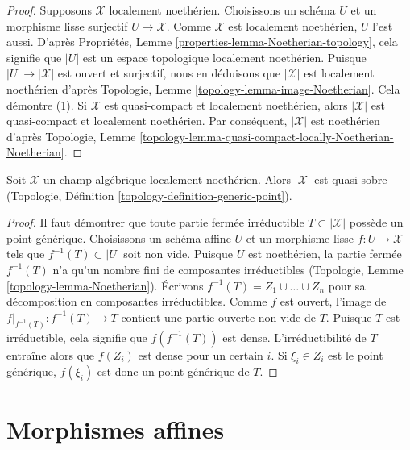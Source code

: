\begin{proof}
Supposons $\mathcal{X}$ localement noethérien. Choisissons un schéma $U$ et un
morphisme lisse surjectif $U \to \mathcal{X}$. Comme $\mathcal{X}$ est
localement noethérien, $U$ l'est aussi. D'après Propriétés, Lemme
\ref{properties-lemma-Noetherian-topology}, cela signifie que $|U|$ est un
espace topologique localement noethérien. Puisque
$|U| \to |\mathcal{X}|$ est ouvert et surjectif, nous en déduisons que
$|\mathcal{X}|$ est localement noethérien d'après Topologie, Lemme
\ref{topology-lemma-image-Noetherian}. Cela démontre (1). Si $\mathcal{X}$ est
quasi-compact et localement noethérien, alors $|\mathcal{X}|$ est
quasi-compact et localement noethérien. Par conséquent, $|\mathcal{X}|$ est
noethérien d'après Topologie, Lemme
\ref{topology-lemma-quasi-compact-locally-Noetherian-Noetherian}.
\end{proof}

\begin{lemma}
\label{lemma-locally-Noetherian-quasi-sober}
Soit $\mathcal{X}$ un champ algébrique localement noethérien.
Alors $|\mathcal{X}|$ est quasi-sobre (Topologie, Définition
\ref{topology-definition-generic-point}).
\end{lemma}

\begin{proof}
Il faut démontrer que toute partie fermée irréductible
$T \subset |\mathcal{X}|$ possède un point générique. Choisissons un schéma
affine $U$ et un morphisme lisse $f : U \to \mathcal{X}$ tels que
$f^{-1}(T) \subset |U|$ soit non vide. Puisque $U$ est noethérien, la partie
fermée $f^{-1}(T)$ n'a qu'un nombre fini de composantes irréductibles
(Topologie, Lemme \ref{topology-lemma-Noetherian}). Écrivons
$f^{-1}(T) = Z_1 \cup \ldots \cup Z_n$ pour sa décomposition en composantes
irréductibles. Comme $f$ est ouvert, l'image de
$f|_{f^{-1}(T)} : f^{-1}(T) \to T$ contient une partie ouverte non vide de
$T$. Puisque $T$ est irréductible, cela signifie que $f(f^{-1}(T))$ est
dense. L'irréductibilité de $T$ entraîne alors que $f(Z_i)$ est dense pour un
certain $i$. Si $\xi_i \in Z_i$ est le point générique, $f(\xi_i)$ est donc
un point générique de $T$.
\end{proof}





\section{Morphismes affines}
\label{section-affine}

